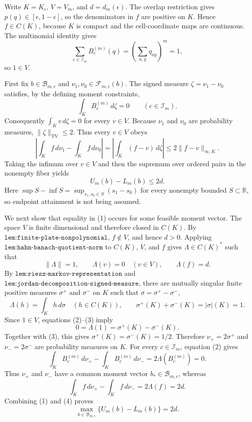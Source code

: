 Write \(K=K_{\epsilon}\), \(V=V_m\), and \(d=d_m(\epsilon)\).  The overlap restriction gives \(p(q)\in[\epsilon,1-\epsilon]\), so the denominators in \(f\) are positive on \(K\).  Hence \(f\in C(K)\), because \(K\) is compact and the cell-coordinate maps are continuous.  The multinomial identity gives
\[
 \sum_{c\in\mathcal I_m}B_c^{(m)}(q)
 =\left(\sum_{a,y}q_{ay}\right)^m=1,
\]
so \(1\in V\).

First fix \(b\in\mathcal B_{m,\epsilon}\) and \(\nu_1,\nu_0\in\mathcal F_{m,\epsilon}(b)\).  The signed measure \(\zeta=\nu_1-\nu_0\) satisfies, by the defining moment constraints,
\[
 \int_K B_c^{(m)}\,d\zeta=0
 \qquad(c\in\mathcal I_m).
\]
Consequently \(\int_Kv\,d\zeta=0\) for every \(v\in V\).  Because \(\nu_1\) and \(\nu_0\) are probability measures, \(\lVert\zeta\rVert_{\mathrm{TV}}\leq2\).  Thus every \(v\in V\) obeys
\[
 \left|\int_K f\,d\nu_1-\int_K f\,d\nu_0\right|
 =\left|\int_K(f-v)\,d\zeta\right|
 \leq2\lVert f-v\rVert_{\infty,K}.
\]
Taking the infimum over \(v\in V\) and then the supremum over ordered pairs in the nonempty fiber yields
\[
 U_m(b)-L_m(b)\leq2d. \tag{1}
\]
Here \(\sup S-\inf S=\sup_{s_1,s_0\in S}(s_1-s_0)\) for every nonempty bounded \(S\subset\mathbb R\), so endpoint attainment is not being assumed.

We next show that equality in (1) occurs for some feasible moment vector.  The space \(V\) is finite dimensional and therefore closed in \(C(K)\).  By \(\texttt{lem:finite-plate-nonpolynomial}\), \(f\notin V\), and hence \(d>0\).  Applying \(\texttt{lem:hahn-banach-quotient-norm}\) to \(C(K)\), \(V\), and \(f\) gives \(\Lambda\in C(K)^*\) such that
\[
 \lVert\Lambda\rVert=1,
 \qquad \Lambda(v)=0\quad(v\in V),
 \qquad \Lambda(f)=d. \tag{2}
\]
By \(\texttt{lem:riesz-markov-representation}\) and \(\texttt{lem:jordan-decomposition-signed-measure}\), there are mutually singular finite positive measures \(\sigma^+\) and \(\sigma^-\) on \(K\) such that \(\sigma=\sigma^+-\sigma^-\),
\[
 \Lambda(h)=\int_Kh\,d\sigma
 \quad(h\in C(K)),
 \qquad
 \sigma^+(K)+\sigma^-(K)=|\sigma|(K)=1. \tag{3}
\]
Since \(1\in V\), equations (2)--(3) imply
\[
 0=\Lambda(1)=\sigma^+(K)-\sigma^-(K).
\]
Together with (3), this gives \(\sigma^+(K)=\sigma^-(K)=1/2\).  Therefore \(\nu_+=2\sigma^+\) and \(\nu_-=2\sigma^-\) are probability measures on \(K\).  For every \(c\in\mathcal I_m\), equation (2) gives
\[
 \int_KB_c^{(m)}\,d\nu_+
 -\int_KB_c^{(m)}\,d\nu_-
 =2\Lambda(B_c^{(m)})=0.
\]
Thus \(\nu_+\) and \(\nu_-\) have a common moment vector \(b_*\in\mathcal B_{m,\epsilon}\), whereas
\[
 \int_Kf\,d\nu_+-\int_Kf\,d\nu_-
 =2\Lambda(f)=2d. \tag{4}
\]
Combining (1) and (4) proves
\[
 \max_{b\in\mathcal B_{m,\epsilon}}
 \{U_m(b)-L_m(b)\}=2d. \tag{5}
\]

